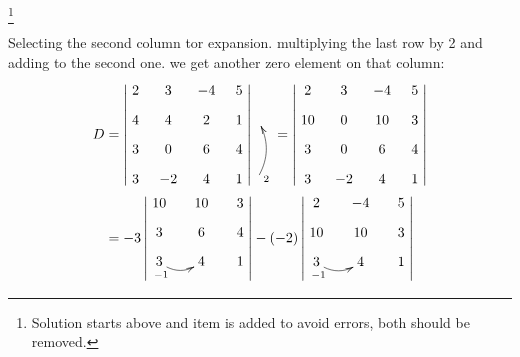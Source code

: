 \documentclass{amsbook}
\begin{document}

    \begin{hEnumerateArabic}
    \item[]
    \begin{hSolution}\footnote{Solution starts above and item is added to avoid errors, both should be removed.}
    \par Selecting the second column tor expansion. multiplying the last row by 2 and adding to the second one. we get another zero element on that column:
    \begin{align*}
        D &= 
        \begin{vmatrix}
            \xymatrix @R=3mm @C=3mm {
                 2 &  3 & -4 & 5 \\
                 4 &  4 &  2 & 1 \\
                 3 &  0 &  6 & 4 \\
                 3 & -2 &  4 & 1 
            }
        \end{vmatrix}
        \begin{matrix}
            \xymatrix @R=5mm {
                \\ \\ \\ \ar@/_/[uu]_<2
            }
        \end{matrix}
        =
        \begin{vmatrix}
            \xymatrix @R=3mm @C=3mm {
                 2 &  3 & -4 &  5 \\
                10 &  0 & 10 &  3 \\
                 3 &  0 &  6 &  4 \\
                 3 & -2 &  4 &  1
            }
        \end{vmatrix}
        \\%
        &= -3
        \begin{vmatrix}
            \xymatrix @R=3mm @C=5mm {
                10 & 10 &  3 \\
                 3 &  6 &  4 \\
                 3 \ar@/_/[r]_<{-1} &  4 &  1
            }
        \end{vmatrix}
        -(-2)
        \begin{vmatrix}
            \xymatrix @R=3mm @C=5mm {
                 2 & -4 &  5 \\
                10 & 10 &  3 \\
                 3 \ar@/_/[r]_<{-1} &  4 &  1
            }

\end{vmatrix}
\end{align*}
\end{hSolution}
\end{hEnumerateArabic}
\end{document}
